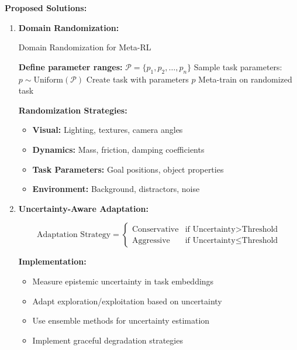 \documentclass[12pt]{article}
\begin{document}
{{			\textbf{Proposed Solutions:}
			
			\begin{enumerate}
				\item \textbf{Domain Randomization:}
				
				\begin{algorithm}[H]
				\caption{Domain Randomization for Meta-RL}
				\begin{algorithmic}[1]
				\STATE \textbf{Define parameter ranges:} $\mathcal{P} = \{p_1, p_2, \ldots, p_n\}$
				\STATE Sample task parameters: $p \sim \text{Uniform}(\mathcal{P})$
				\STATE Create task with parameters $p$
				\STATE Meta-train on randomized task
				\ENDFOR
				\end{algorithmic}
				\end{algorithm}
				
				\textbf{Randomization Strategies:}
				\begin{itemize}
					\item \textbf{Visual:} Lighting, textures, camera angles
					\item \textbf{Dynamics:} Mass, friction, damping coefficients
					\item \textbf{Task Parameters:} Goal positions, object properties
					\item \textbf{Environment:} Background, distractors, noise
				\end{itemize}
				
				\item \textbf{Uncertainty-Aware Adaptation:}
				
				\begin{equation}
				\text{Adaptation Strategy} = \begin{cases}
				\text{Conservative} & \text{if } \text{Uncertainty} > \text{Threshold} \\
				\text{Aggressive} & \text{if } \text{Uncertainty} \leq \text{Threshold}
				\end{cases}
				\end{equation}
				
				\textbf{Implementation:}
				\begin{itemize}
					\item Measure epistemic uncertainty in task embeddings
					\item Adapt exploration/exploitation based on uncertainty
					\item Use ensemble methods for uncertainty estimation
					\item Implement graceful degradation strategies
				\end{itemize}
				

\end{enumerate}}}
\end{document}
